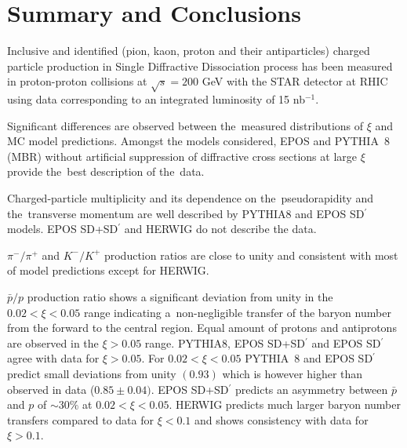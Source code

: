 \chapter{Summary and Conclusions}\label{chapter:summary}

Inclusive and identified (pion, kaon, proton and their antiparticles) charged particle production in Single Diffractive Dissociation process has been measured in proton-proton collisions at $\sqrt{s}= 200$ GeV with the STAR detector at RHIC using data corresponding to an integrated luminosity of 15 nb$^{-1}$.

Significant differences are observed between the~measured distributions  of $\xi$ and \ac{MC} model predictions. Amongst the models considered, EPOS and PYTHIA~8 (MBR) without artificial suppression of diffractive cross sections at large $\xi$ provide the~best description of the~data.

Charged-particle multiplicity and its dependence  on the~pseudorapidity and the~transverse momentum  are well described by PYTHIA8 and EPOS SD$^\prime$ models.  EPOS SD+SD$^\prime$ and HERWIG do not describe the data.

$\pi^-/\pi^+$ and $K^-/K^+$ production ratios  are close to unity and consistent with most of model predictions except for HERWIG. 

$\bar{p}/p$ production ratio shows a significant deviation from unity 
in the $0.02<\xi<0.05$ range indicating a~non-negligible transfer of the baryon number from the forward to the central region. Equal amount of protons and antiprotons are observed in the $\xi>0.05$ range.
PYTHIA8, EPOS SD+SD$^\prime$ and EPOS SD$^\prime$ agree with data for $\xi>0.05$. 
For $0.02<\xi<0.05$ PYTHIA~8 and EPOS SD$^\prime$ predict small deviations from unity $(0.93)$ which is however higher than observed in data ($0.85\pm 0.04)$. EPOS SD+SD$^\prime$ predicts an asymmetry between $\bar{p}$ and $p$ of $\sim30\%$ at $0.02<\xi<0.05$.
HERWIG  predicts much larger baryon number transfers compared to data for $\xi<0.1$ and shows consistency with data for $\xi>0.1$.